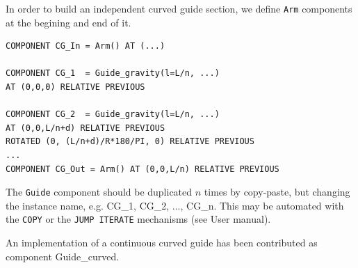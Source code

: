 In order to build an independent curved guide section, we define \verb+Arm+ components at the begining and end of it.
\begin{verbatim}
COMPONENT CG_In = Arm() AT (...)

COMPONENT CG_1  = Guide_gravity(l=L/n, ...)
AT (0,0,0) RELATIVE PREVIOUS

COMPONENT CG_2  = Guide_gravity(l=L/n, ...)
AT (0,0,L/n+d) RELATIVE PREVIOUS
ROTATED (0, (L/n+d)/R*180/PI, 0) RELATIVE PREVIOUS
...
COMPONENT CG_Out = Arm() AT (0,0,L/n) RELATIVE PREVIOUS
\end{verbatim}
The \verb+Guide+ component should be duplicated $n$ times by copy-paste, but changing the instance name, e.g. CG\_1, CG\_2, ..., CG\_n. This may be automated with the \verb+COPY+ or the \verb+JUMP ITERATE+ mechanisms (see User manual).

An implementation of a continuous curved guide has been contributed as component Guide\_curved.

